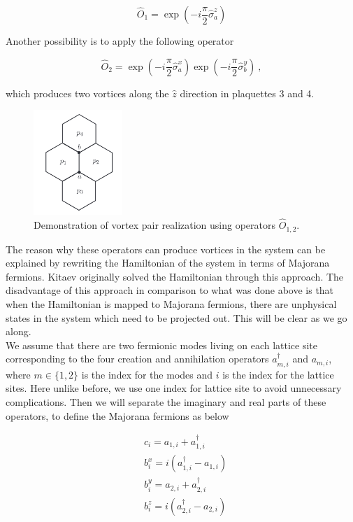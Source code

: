 \documentclass{article}
\begin{document}
\begin{equation}\label{eq:18}
    \hat{O}_1 = \exp{(-i\frac{\pi}{2}\hat{\sigma}^{z}_a)}
\end{equation}{}

Another possibility is to apply the following operator 

\begin{equation}\label{eq:19}
    \hat{O}_2 = \exp{(-i\frac{\pi}{2}\hat{\sigma}^{x}_a)}\exp{(-i\frac{\pi}{2}\hat{\sigma}^{y}_b)}~,
\end{equation}{}

which produces two vortices along the $\hat{z}$ direction in plaquettes 3 and 4.

\begin{figure}[!htb]
    \centering
    \includegraphics[width=0.3\textwidth]{./images/anyons.png}
    \caption{Demonstration of vortex pair realization using operators $\hat{O}_{1,2}$.}
    \label{fig:anyons}
\end{figure}{}

The reason why these operators can produce vortices in the system can be explained by rewriting the Hamiltonian of the system in terms of Majorana fermions. Kitaev originally solved the Hamiltonian through this approach. The disadvantage of this approach in comparison to what was done above is that when the Hamiltonian is mapped to Majorana fermions, there are unphysical states in the system which need to be projected out. This will be clear as we go along.\\

We assume that there are two fermionic modes living on each lattice site corresponding to the four creation and annihilation operators $a^\dagger_{m,i}$ and $a_{m,i}$, where $m\in \{1,2\}$ is the index for the modes and $i$ is the index for the lattice sites. Here unlike before, we use one index for lattice site to avoid unnecessary complications. Then we will separate the imaginary and real parts of these operators, to define the Majorana fermions as below

\begin{equation}\label{eq:20}
    \begin{aligned}
        & c_i = a_{1,i} + a^\dagger_{1,i} \\
        & b^x_i = i(a^\dagger_{1,i} - a_{1,i}) \\
        & b^y_i = a_{2,i} + a^\dagger_{2,i} \\
        & b^z_i = i(a^\dagger_{2,i} - a_{2,i})
    \end{aligned}
\end{equation}{}\\
\end{document}
